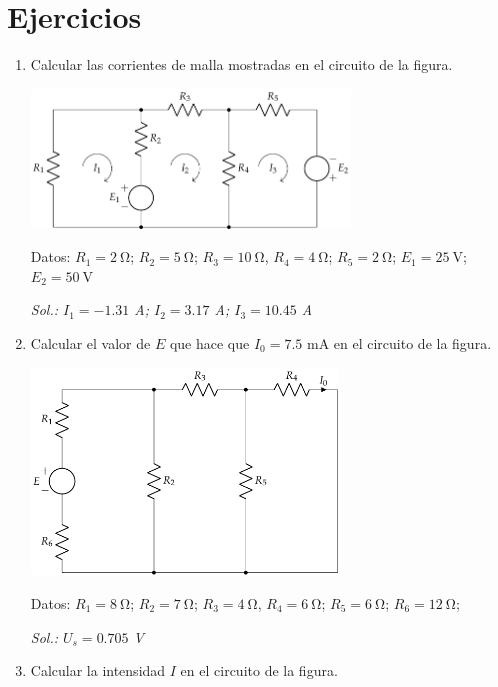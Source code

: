 \section*{Ejercicios}

\begin{enumerate}
\item Calcular las corrientes de malla mostradas en el circuito de la
  figura.

  \begin{center}
    \includegraphics[height=3.7cm]{../figs/ej2_BT1.pdf}
  \end{center}
  
  Datos: $R_1 = \qty{2}{\ohm}$; $R_2 = \qty{5}{\ohm}$; $R_3 = \qty{10}{\ohm}$, $R_4 = \qty{4}{\ohm}$; $R_5 = \qty{2}{\ohm}$; $E_1 = \qty{25}{\volt}$; $E_2 = \qty{50}{\volt}$

  \emph{Sol.: $I_1=-1.31$ A; $I_2=3.17$ A; $I_3=10.45$ A}
		
\item Calcular el valor de $E$ que hace que $I_0=7.5$ mA en el
  circuito de la figura.
  
  \begin{center}
    \includegraphics[height=5.5cm]{../figs/ej3_BT1.pdf}
  \end{center}

  Datos: $R_1 = \qty{8}{\ohm}$; $R_2 = \qty{7}{\ohm}$; $R_3 = \qty{4}{\ohm}$, $R_4 = \qty{6}{\ohm}$; $R_5 = \qty{6}{\ohm}$; $R_6 = \qty{12}{\ohm}$; 

  \emph{Sol.: $U_s=0.705$ V}
		
\item Calcular la intensidad $I$ en el circuito de la figura.


\end{enumerate}
